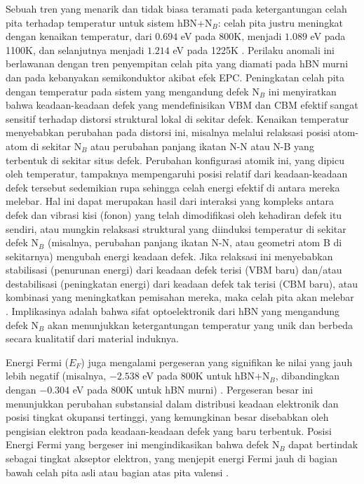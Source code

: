 Sebuah tren yang menarik dan tidak biasa teramati pada ketergantungan celah pita terhadap temperatur untuk sistem hBN+N$_B$: celah pita justru meningkat dengan kenaikan temperatur, dari $0.694$ eV pada 800K, menjadi $1.089$ eV pada 1100K, dan selanjutnya menjadi $1.214$ eV pada 1225K \cite{[1, 1]}. Perilaku anomali ini berlawanan dengan tren penyempitan celah pita yang diamati pada hBN murni dan pada kebanyakan semikonduktor akibat efek EPC. Peningkatan celah pita dengan temperatur pada sistem yang mengandung defek N$_B$ ini menyiratkan bahwa keadaan-keadaan defek yang mendefinisikan VBM dan CBM efektif sangat sensitif terhadap distorsi struktural lokal di sekitar defek. Kenaikan temperatur menyebabkan perubahan pada distorsi ini, misalnya melalui relaksasi posisi atom-atom di sekitar N$_B$ atau perubahan panjang ikatan N-N atau N-B yang terbentuk di sekitar situs defek. Perubahan konfigurasi atomik ini, yang dipicu oleh temperatur, tampaknya mempengaruhi posisi relatif dari keadaan-keadaan defek tersebut sedemikian rupa sehingga celah energi efektif di antara mereka melebar. Hal ini dapat merupakan hasil dari interaksi yang kompleks antara defek dan vibrasi kisi (fonon) yang telah dimodifikasi oleh kehadiran defek itu sendiri, atau mungkin relaksasi struktural yang diinduksi temperatur di sekitar defek N$_B$ (misalnya, perubahan panjang ikatan N-N, atau geometri atom B di sekitarnya) mengubah energi keadaan defek. Jika relaksasi ini menyebabkan stabilisasi (penurunan energi) dari keadaan defek terisi (VBM baru) dan/atau destabilisasi (peningkatan energi) dari keadaan defek tak terisi (CBM baru), atau kombinasi yang meningkatkan pemisahan mereka, maka celah pita akan melebar \cite{[1]}. Implikasinya adalah bahwa sifat optoelektronik dari hBN yang mengandung defek N$_B$ akan menunjukkan ketergantungan temperatur yang unik dan berbeda secara kualitatif dari material induknya.

Energi Fermi ($E_F$) juga mengalami pergeseran yang signifikan ke nilai yang jauh lebih negatif (misalnya, $-2.538$ eV pada 800K untuk hBN+N$_B$, dibandingkan dengan $-0.304$ eV pada 800K untuk hBN murni) \cite{[1, 1]}. Pergeseran besar ini menunjukkan perubahan substansial dalam distribusi keadaan elektronik dan posisi tingkat okupansi tertinggi, yang kemungkinan besar disebabkan oleh pengisian elektron pada keadaan-keadaan defek yang baru terbentuk. Posisi Energi Fermi yang bergeser ini mengindikasikan bahwa defek N$_B$ dapat bertindak sebagai tingkat akseptor elektron, yang menjepit energi Fermi jauh di bagian bawah celah pita asli atau bagian atas pita valensi \cite{[1, 1]}.


